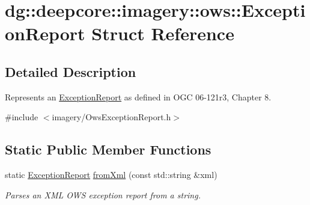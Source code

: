 \hypertarget{structdg_1_1deepcore_1_1imagery_1_1ows_1_1_exception_report}{}\section{dg\+:\+:deepcore\+:\+:imagery\+:\+:ows\+:\+:Exception\+Report Struct Reference}
\label{structdg_1_1deepcore_1_1imagery_1_1ows_1_1_exception_report}


\subsection{Detailed Description}
Represents an \hyperlink{structdg_1_1deepcore_1_1imagery_1_1ows_1_1_exception_report}{Exception\+Report} as defined in O\+GC 06-\/121r3, Chapter 8. 

{\ttfamily \#include $<$imagery/\+Ows\+Exception\+Report.\+h$>$}

\subsection*{Static Public Member Functions}
\begin{DoxyCompactItemize}
\item 
static \hyperlink{structdg_1_1deepcore_1_1imagery_1_1ows_1_1_exception_report}{Exception\+Report} \hyperlink{group___imagery_module_ga7b82aed41808b9bebc202721d9a5adce}{from\+Xml} (const std\+::string \&xml)
\begin{DoxyCompactList}\small\item\em Parses an X\+ML O\+WS exception report from a string. \end{DoxyCompactList}\end{DoxyCompactItemize}
